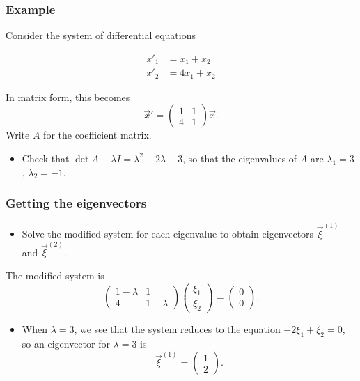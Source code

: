 \begin{frame}

\frametitle{Example}
\label{example}

Consider the system of differential equations
 
\begin{align*}
    x'_1 &= x_1 + x_2 \\
    x'_2 &= 4x_1 + x_2
\end{align*}

In matrix form, this becomes
\[
    \vec{x}' = \begin{pmatrix}
        1 & 1 \\
        4 & 1
    \end{pmatrix} \vec{x}.
\]
Write $ A $ for the coefficient matrix.

\begin{itemize}
\item Check that $ \det{A - \lambda I} = \lambda^2 - 2 \lambda -3 $, so that the eigenvalues of $ A $ are $ \lambda_1 = 3 $, $ \lambda_2 = -1 $.

\end{itemize}

\end{frame}

\begin{frame}

\frametitle{Getting the eigenvectors}
\label{gettingtheeigenvectors}

\begin{itemize}
\item Solve the modified system for each eigenvalue to obtain eigenvectors $ \vec{\xi}^{(1)} $ and $ \vec{\xi}^{(2)} $.

\end{itemize}

The modified system is
\[
    \begin{pmatrix}
        1 - \lambda & 1 \\
        4 & 1 - \lambda
    \end{pmatrix} \begin{pmatrix} \xi_1 \\ \xi_2 \end{pmatrix} = \begin{pmatrix} 0 \\ 0 \end{pmatrix}.
\]

\begin{itemize}
\item When $ \lambda = 3 $, we see that the system reduces to the equation $ -2 \xi_1 + \xi_2 = 0 $, so an eigenvector for $ \lambda = 3 $ is
\[
\vec{\xi}^{(1)} = \begin{pmatrix} 1 \\ 2 \end{pmatrix}.
\]

\end{itemize}

\end{frame}

